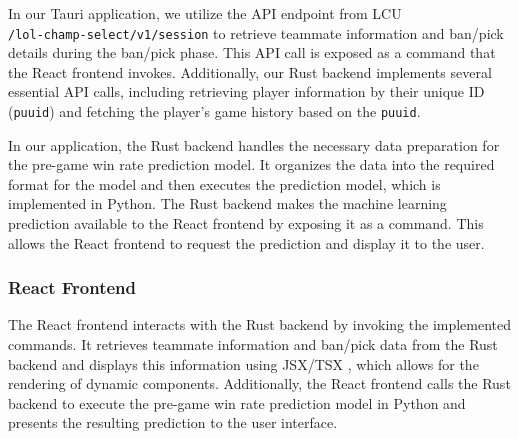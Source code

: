 \documentclass[11pt,a4paper,oneside]{report}
\begin{document}
In our Tauri application, we utilize the API endpoint from LCU \\\texttt{/lol-champ-select/v1/session} to retrieve teammate information and ban/pick details during the ban/pick phase. This API call is exposed as a command that the React frontend invokes. Additionally, our Rust backend implements several essential API calls, including retrieving player information by their unique ID (\texttt{puuid}) and fetching the player's game history based on the \texttt{puuid}.

In our application, the Rust backend handles the necessary data preparation for the pre-game win rate prediction model. It organizes the data into the required format for the model and then executes the prediction model, which is implemented in Python. The Rust backend makes the machine learning prediction available to the React frontend by exposing it as a command. This allows the React frontend to request the prediction and display it to the user.

\subsubsection{React Frontend}

The React frontend interacts with the Rust backend by invoking the implemented commands. It retrieves teammate information and ban/pick data from the Rust backend and displays this information using JSX/TSX \cite{react-jsx}, which allows for the rendering of dynamic components. Additionally, the React frontend calls the Rust backend to execute the pre-game win rate prediction model in Python and presents the resulting prediction to the user interface.
\end{document}
